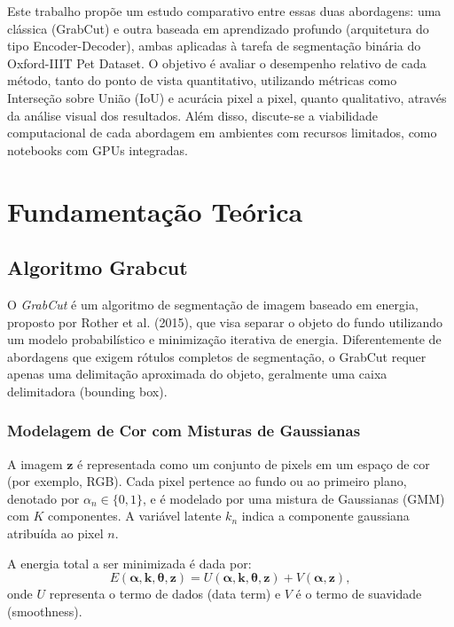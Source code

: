 \documentclass[journal]{IEEEtran}
\begin{document}
Este trabalho propõe um estudo comparativo entre essas duas abordagens: uma clássica (GrabCut) e outra baseada em aprendizado profundo (arquitetura do tipo Encoder-Decoder), ambas aplicadas à tarefa de segmentação binária do Oxford-IIIT Pet Dataset. O objetivo é avaliar o desempenho relativo de cada método, tanto do ponto de vista quantitativo, utilizando métricas como Interseção sobre União (IoU) e acurácia pixel a pixel, quanto qualitativo, através da análise visual dos resultados. Além disso, discute-se a viabilidade computacional de cada abordagem em ambientes com recursos limitados, como notebooks com GPUs integradas.

\section{Fundamentação Teórica}

\subsection{Algoritmo Grabcut}
O \textit{GrabCut} é um algoritmo de segmentação de imagem baseado em energia, proposto por Rother et al. (2015)\cite{10.1145/1186562.1015720}, que visa separar o objeto do fundo utilizando um modelo probabilístico e minimização iterativa de energia. Diferentemente de abordagens que exigem rótulos completos de segmentação, o GrabCut requer apenas uma delimitação aproximada do objeto, geralmente uma caixa delimitadora (bounding box).

\subsubsection{Modelagem de Cor com Misturas de Gaussianas}

A imagem $\mathbf{z}$ é representada como um conjunto de pixels em um espaço de cor (por exemplo, RGB). Cada pixel pertence ao fundo ou ao primeiro plano, denotado por $\alpha_n \in \{0, 1\}$, e é modelado por uma mistura de Gaussianas (GMM) com $K$ componentes. A variável latente $k_n$ indica a componente gaussiana atribuída ao pixel $n$.

A energia total a ser minimizada é dada por:
\begin{equation}
E(\boldsymbol{\alpha}, \mathbf{k}, \boldsymbol{\theta}, \mathbf{z}) = U(\boldsymbol{\alpha}, \mathbf{k}, \boldsymbol{\theta}, \mathbf{z}) + V(\boldsymbol{\alpha}, \mathbf{z}),
\end{equation}
onde $U$ representa o termo de dados (data term) e $V$ é o termo de suavidade (smoothness).
\end{document}
